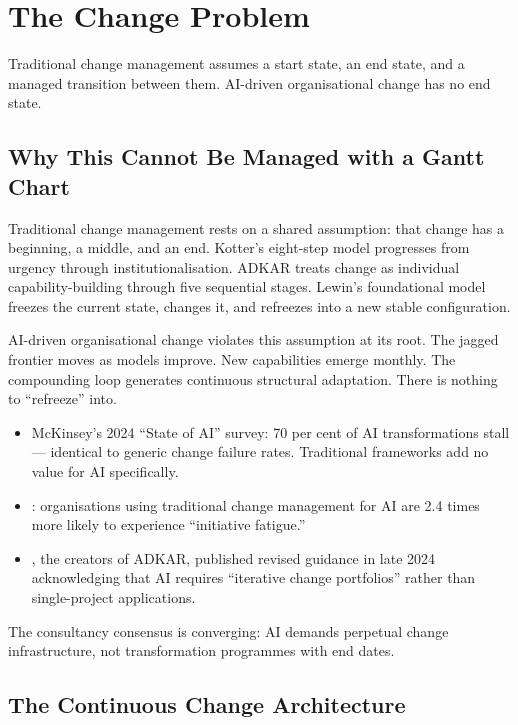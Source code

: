 \chapter{The Change Problem}
\label{ch:change-problem}

\epigraph{Traditional change management assumes a start state, an end state, and a managed transition between them. AI-driven organisational change has no end state.}{}

\section{Why This Cannot Be Managed with a Gantt Chart}

Traditional change management rests on a shared assumption: that change has a beginning, a middle, and an end. Kotter's eight-step model progresses from urgency through institutionalisation. ADKAR treats change as individual capability-building through five sequential stages. Lewin's foundational model freezes the current state, changes it, and refreezes into a new stable configuration.

AI-driven organisational change violates this assumption at its root. The jagged frontier moves as models improve. New capabilities emerge monthly. The compounding loop generates continuous structural adaptation. There is nothing to ``refreeze'' into.

\begin{evidencebox}[title={Evidence for Framework Failure}]
\begin{itemize}
  \item McKinsey's 2024 ``State of AI'' survey: 70 per cent of AI transformations stall --- identical to generic change failure rates. Traditional frameworks add no value for AI specifically.
  \item \textcite{Gartner2025}: organisations using traditional change management for AI are 2.4 times more likely to experience ``initiative fatigue.''
  \item \textcite{Prosci2024}, the creators of ADKAR, published revised guidance in late 2024 acknowledging that AI requires ``iterative change portfolios'' rather than single-project applications.
\end{itemize}
The consultancy consensus is converging: AI demands perpetual change infrastructure, not transformation programmes with end dates.
\end{evidencebox}

\section{The Continuous Change Architecture}

